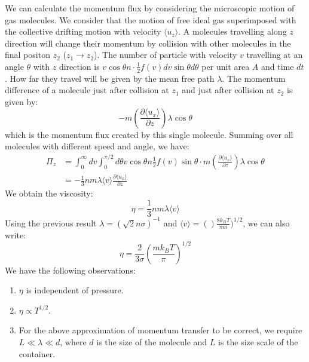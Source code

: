\documentclass{article}
\begin{document}
We can calculate the momentum flux by considering the microscopic motion of gas molecules. We consider that the motion of free ideal gas superimposed 
with the collective drifting motion with velocity $\langle u_z \rangle$. A molecules travelling along $z$ direction will
change their momentum by collision with other molecules in the final positon $z_2$ ($z_1 \to z_2$). The number of particle with velocity $v$ travelling
at an angle $\theta$ with $z$ direction is $ v\cos \theta n \cdot \frac{1}{2} f(v) dv \sin\theta d\theta $ per unit area $A$ and time $dt$. How far they 
travel will be given by the mean free path $\lambda$. The momentum difference of a molecule just after collision at $z_1$ and just after collision at $z_2$ is 
given by:
\begin{equation}
    - m \left( \frac{\partial \langle u_x \rangle}{\partial z} \right) \lambda \cos\theta
\end{equation}
which is the momentum flux created by this single molecule. Summing over all molecules with different speed and angle, we have:
\begin{align}
    \Pi_z &= \int_0^{\infty} dv \int_0^{\pi/2} d\theta 
     v \cos \theta n \frac{1}{2} f(v) \sin\theta \cdot m \left( \frac{\partial \langle u_x \rangle}{\partial z} \right) \lambda \cos\theta \\
     &= -\frac{1}{3} n m \lambda \langle v \rangle \frac{\partial \langle u_x \rangle}{\partial z} \label{momentum_transfer}
\end{align}
We obtain the viscosity:
\begin{equation}
    \eta = \frac{1}{3} n m \lambda \langle v \rangle
\end{equation}
Using the previous result $\lambda = (\sqrt{2}n\sigma)^{-1}$ and $\langle v \rangle = ()\frac{8k_BT}{\pi m})^{1/2}$, we can also write:
\begin{equation}
    \eta = \frac{2}{3\sigma}\left( \frac{mk_BT}{\pi} \right)^{1/2}
\end{equation}
We have the following observations:
\begin{enumerate}
    \item $\eta$ is independent of pressure.
    \item $\eta \propto T^{1/2}$.
    \item For the above approximation of momentum transfer to be correct, we require $ L \ll \lambda \ll d $, where $d$ is the size of the molecule and $L$ is the size scale of the container.
\end{enumerate}
\end{document}
